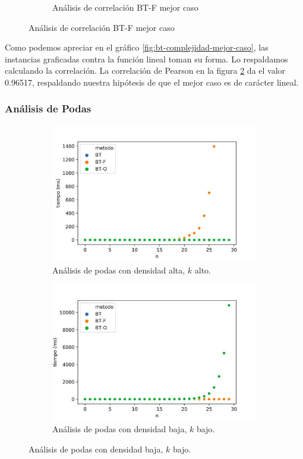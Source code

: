 \documentclass[10pt,a4paper]{article}
\begin{document}
\begin{figure}[h!]
\begin{subfigure}{0.4\linewidth}
		\caption{Análisis de correlación BT-F mejor caso}
		\label{fig:bt-correlacion-mejor-caso}
\end{subfigure}
\end{figure}
\newline
Como podemos apreciar en el gráfico \ref{fig:bt-complejidad-mejor-caso}, las instancias graficadas contra la función lineal toman su forma. Lo respaldamos calculando la correlación.
La correlación de Pearson en la figura \ref{fig:bt-correlacion-mejor-caso} da el valor 0.96517, respaldando nuestra hipótesis de que el mejor caso es de carácter lineal.
\subsubsection{Análisis de Podas}
\begin{figure}[h!]
	\centering
	\begin{subfigure}{0.45\linewidth}
		\centering
		\includegraphics[scale=0.3]{img/bt-podas-alta.jpg}
		\caption{Análisis de podas con densidad alta, $k$ alto.}
		\label{fig:bt-poda-alto}
	\end{subfigure}
	\begin{subfigure}{0.45\linewidth}
		\centering
		\includegraphics[scale=0.3]{img/bt-podas-baja.jpg}
		\caption{Análisis de podas con densidad baja, $k$ bajo.}
		\label{fig:bt-poda-bajo}
	\end{subfigure}
	\label{fig:exp-bt-podas}
\end{figure}
\end{document}
